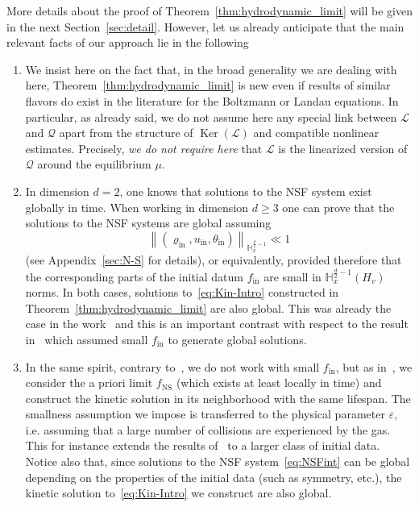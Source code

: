 \documentclass[AHL,Unicode,longabstracts,published]{cedram}
\DeclareMathOperator{\nul}{Ker}
\newcommand{\ini}{\mathrm{in}}
\newcommand{\ns}{\mathrm{NS}}
\newcommand{\bbH}{\mathbb{H}}
\newcommand{\LL}{\mathcal{L}}
\newcommand{\QQ}{\mathcal{Q}}
\newcommand{\Ss}{H}
\renewcommand*\ge{\geqslant}
\newcommand*\eps{{\varepsilon}}
\newcommand*{\relabel}{\renewcommand{\labelenumi}{(\theenumi)}}
\newcommand*{\romanenumi}{\renewcommand*{\theenumi}{\roman{enumi}}\relabel}
\begin{document}
More details about the proof of Theorem~\ref{thm:hydrodynamic_limit} will be given in the next Section~\ref{sec:detail}. However, let us already anticipate that the main relevant facts of our approach lie in the following
\begin{enumerate}\romanenumi
\item We insist here on the fact that, in the broad generality we are dealing with here, Theorem~\ref{thm:hydrodynamic_limit} is new even if results of similar flavors do exist in the literature for the Boltzmann or Landau equations. In particular, as already said, we do not assume here any special link between $\LL$ and $\QQ$ apart from the structure of $\nul(\LL)$ and compatible nonlinear estimates. Precisely, \emph{we do not require here} that $\LL$ is the linearized version of $\QQ$ around the equilibrium $\mu$.

\item In dimension $d=2$, one knows that solutions to the NSF system exist globally in time. When working in dimension $d\ge 3$ one can prove that the solutions to the NSF systems are global assuming
\[
\left\|(\varrho_\ini,u_\ini,\theta_\ini)\right\|_{\bbH^{\frac{d}{2}-1}_x} \ll 1
\]
(see Appendix~\ref{sec:N-S} for details), or equivalently, provided therefore that {the corresponding parts of the initial datum $f_\ini$ are small in $\bbH^{\frac{d}{2}-1}_{x}(\Ss_v)$ norms.} In both cases, solutions to~\eqref{eq:Kin-Intro} constructed in Theorem~\ref{thm:hydrodynamic_limit} are also global. This was already the case in the work~\cite{GT2020} and this is an important contrast with respect to the result in~\cite{BU1991} which assumed small $f_{\ini}$ to generate global solutions.

\item In the same spirit, contrary to~\cite{BU1991, CC2023,CRT2022}, we do not work with small $f_\ini$, but as in~\cite{G2023,GT2020}, we consider the a priori limit $f_{\ns}$ (which exists at least locally in time) and construct the kinetic solution in its neighborhood with the same lifespan. The smallness assumption we impose is transferred to the physical parameter $\eps$, i.e. assuming that a large number of collisions are experienced by the gas. This for instance extends the results of~\cite{CC2023,CRT2022} to a larger class of initial data. Notice also that, since solutions to the NSF system~\eqref{eq:NSFint} can be global depending on the properties of the initial data (such as {symmetry, etc.}), the kinetic solution to~\eqref{eq:Kin-Intro} we construct are also global.


\end{enumerate}
\end{document}
